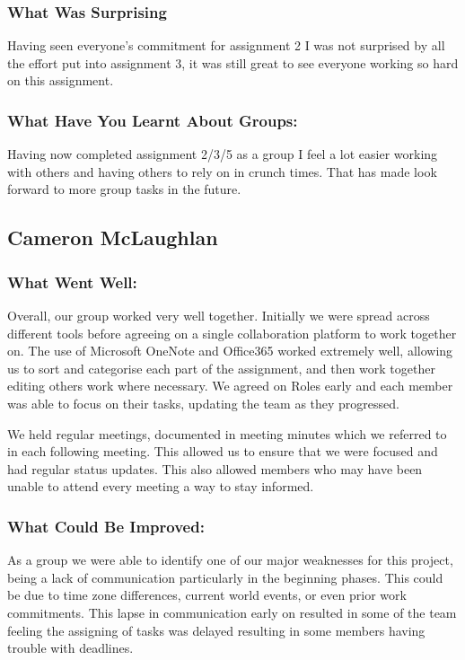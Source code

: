 \documentclass[11pt, oneside, a4paper, titlepage]{article}
\begin{document}
\subsubsection{What Was Surprising}
Having seen everyone’s commitment for assignment 2 I was not surprised by all the effort put into assignment 3, it was still great to see everyone working so hard on this assignment.

\subsubsection{What Have You Learnt About Groups:}
Having now completed assignment 2/3/5 as a group I feel a lot easier working with others and having others to rely on in crunch times. That has made look forward to more group tasks in the future.

\subsection{Cameron McLaughlan}
\subsubsection{What Went Well:}
Overall, our group worked very well together. Initially we were spread across different tools before agreeing on a single collaboration platform to work together on.  The use of Microsoft OneNote and Office365 worked extremely well, allowing us to sort and categorise each part of the assignment, and then work together editing others work where necessary.   We agreed on Roles early and each member was able to focus on their tasks, updating the team as they progressed. 

We held regular meetings, documented in meeting minutes which we referred to in each following meeting. This allowed us to ensure that we were focused and had regular status updates.  This also allowed members who may have been unable to attend every meeting a way to stay informed.

\subsubsection{What Could Be Improved:}
As a group we were able to identify one of our major weaknesses for this project, being a lack of communication particularly in the beginning phases. This could be due to time zone differences, current world events, or even prior work commitments. This lapse in communication early on resulted in some of the team feeling the assigning of tasks was delayed resulting in some members having trouble with deadlines.  
\end{document}

